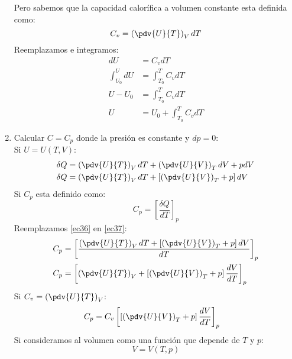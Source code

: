\documentclass[../main]{subfiles}
\begin{document}
\begin{enumerate}
          Pero sabemos que la capacidad calorífica a volumen constante esta definida como:
          \begin{equation}
              C_v=\left( \pdv{U}{T} \right)_V dT
          \end{equation}
          Reemplazamos e integramos:
          \begin{align*}
              dU                & =C_v dT                  \\
              \int_{U_0}^{U} dU & =\int_{T_0}^T C_v dT     \\
              U-U_0             & =\int_{T_0}^T C_v dT     \\
              U                 & =U_0+\int_{T_0}^T C_v dT
          \end{align*}
    \item Calcular $C=C_p$ donde la presión es constante y $dp=0$:\\
          Si $U=U(T,V)$:
          \begin{align}
              \delta Q & =\left(\pdv{U}{T}\right)_V dT+\left( \pdv{U}{V}\right)_T dV+pdV           \\
              \delta Q & =\left(\pdv{U}{T}\right)_V dT+\left[\left( \pdv{U}{V}\right)_T+p\right]dV
              \label{ec36}
          \end{align}
          Si $C_p$ esta definido como:
          \begin{equation}
              C_p=\left[ \dfrac{\delta Q}{dT}\right]_p
              \label{ec37}
          \end{equation}
          Reemplazamos \eqref{ec36} en \eqref{ec37}:
          \begin{align}
              C_p & =\left[ \dfrac{ \displaystyle \left(\pdv{U}{T}\right)_V dT+\left[\left( \pdv{U}{V}\right)_T+p\right]dV}{dT}\right]_p \\
              C_p & =\left[ \left(\pdv{U}{T}\right)_V+\left[\left(\pdv{U}{V}\right)_T+p\right]\dfrac{dV}{dT}\right]_p
          \end{align}
          Si $\displaystyle C_v=\left( \pdv{U}{T}\right)_V$:
          \begin{align}
              C_p & =C_v\left[ \left[\left(\pdv{U}{V}\right)_T+p\right]\dfrac{dV}{dT}\right]_p
              \label{ec40}
          \end{align}
          Si consideramos al volumen como una función que depende de $T$ y $p$:
          \begin{equation}
              V=V(T,p)
          \end{equation}

\end{enumerate}
\end{document}
